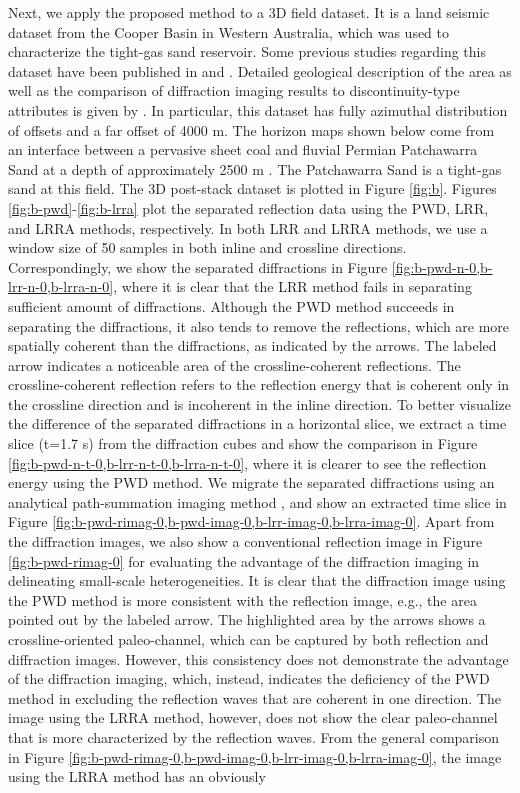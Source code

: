 \documentclass[10pt]{IEEEtran}
\DeclareRobustCommand{\new}[1]{#1}
\begin{document}
Next, we apply the proposed method to a 3D field dataset. \new{It is a land seismic dataset from the Cooper Basin in Western Australia, which was used to characterize the tight-gas sand reservoir. Some previous studies regarding this dataset have been published in \cite{merzlikin2017analytical} and \cite{tyiasning2016comparison}.} \new{Detailed geological description of the area as well as the comparison of diffraction imaging results to discontinuity-type attributes is given by \cite{tyiasning2016comparison}. \new{In particular, this dataset has fully azimuthal distribution of offsets and a far offset of 4000 m. The horizon maps shown below come from an interface between a pervasive sheet coal and fluvial Permian Patchawarra Sand at a depth of approximately 2500 m \cite{tyiasning2016comparison}.} The Patchawarra Sand is a tight-gas sand at this field.} The 3D post-stack dataset is plotted in Figure \ref{fig:b}. Figures \ref{fig:b-pwd}-\ref{fig:b-lrra} plot the separated reflection data using the PWD, LRR, and LRRA methods, respectively. In both LRR and LRRA methods, we use a window size of 50 samples in both inline and crossline directions.  Correspondingly, we show the separated diffractions in Figure \ref{fig:b-pwd-n-0,b-lrr-n-0,b-lrra-n-0}, where it is clear that the LRR method fails in separating sufficient amount of diffractions.  Although the PWD method succeeds in separating the diffractions, it also tends to remove the reflections, which are more spatially coherent than the diffractions, as indicated by the arrows. The labeled arrow indicates a noticeable area of the crossline-coherent reflections. The crossline-coherent reflection refers to the reflection energy that is coherent only in the crossline direction and is incoherent in the inline direction. To better visualize the difference of the separated diffractions in a horizontal slice, we extract a time slice (t=1.7 s) from the diffraction cubes and show the comparison in Figure \ref{fig:b-pwd-n-t-0,b-lrr-n-t-0,b-lrra-n-t-0}, where it is clearer to see the reflection energy using the PWD method. We migrate the separated diffractions using an analytical path-summation imaging method \cite{merzlikin2017analytical}, and show an extracted time slice in Figure \ref{fig:b-pwd-rimag-0,b-pwd-imag-0,b-lrr-imag-0,b-lrra-imag-0}. Apart from the diffraction images, we also show a conventional reflection image in Figure \ref{fig:b-pwd-rimag-0} for evaluating the advantage of the diffraction imaging in delineating small-scale heterogeneities. It is clear that the diffraction image using the PWD method is more consistent with the reflection image, e.g., the area pointed out by the labeled arrow. The highlighted area by the arrows shows a crossline-oriented paleo-channel, which can be captured by both reflection and diffraction images. However, this consistency does not demonstrate the advantage of the diffraction imaging, which, instead, indicates the deficiency of the PWD method in excluding the reflection waves that are coherent in one direction. The image using the LRRA method, however, does not show the clear paleo-channel that is more characterized by the reflection waves. From the general comparison in Figure \ref{fig:b-pwd-rimag-0,b-pwd-imag-0,b-lrr-imag-0,b-lrra-imag-0}, the image using the LRRA method has an obviously 
\end{document}

